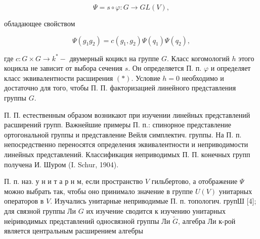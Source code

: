 \documentclass[10pt]{article}
\begin{document}
\[

\Psi=s \circ \varphi: G \longrightarrow G L(V),

\]



обладающее свойством



\[

\Psi\left(g_{1} g_{2}\right)=c\left(g_{1}, g_{2}\right) \Psi\left(q_{1}\right) \Psi\left(q_{2}\right),

\]



где $c: G \times G \rightarrow k^{*}-$ двумерный коцикл на группе $G$. Класс когомологий $h$ этого коцикла не зависит от выбора сечения $s$. Он определяется П. п. $\varphi$ и определяет класс эквивалентности расширения $(*)$. Условие $h=0$ необходимо и достаточно для того, чтобы П. П. факторизацией линейного представления группы $G$.



П. П. естественным образом возникают при изучении линейных представлений расширений групп. Важнейшие примеры П. п.: спинорное представление ортогональной группы и представление Вейля симплектич. группы. На П. п. непосредственно переносятся определения эквивалентности и неприводимости линейных представлений. Классификация неприводимых П. П. конечных групп получена И. Шуром (I. Schur, 1904).



П. п. наз. у н и т а р н м, если пространство $V$ гильбертово, а отображение $\Psi$ можно выбрать так, чтобы оно принимало значение в группе $U(V)$ унитарных операторов в $V$. Изучались унитарные неприводимые П. п. топологич. групШ [4]; для связной группы Ли $G$ их изучение сводится к изучению унитарных неіриводимых представлений односвязной группы Ли $\tilde{G}$, алгебра Ли к-рой является центральным расширением алгебры
\end{document}
